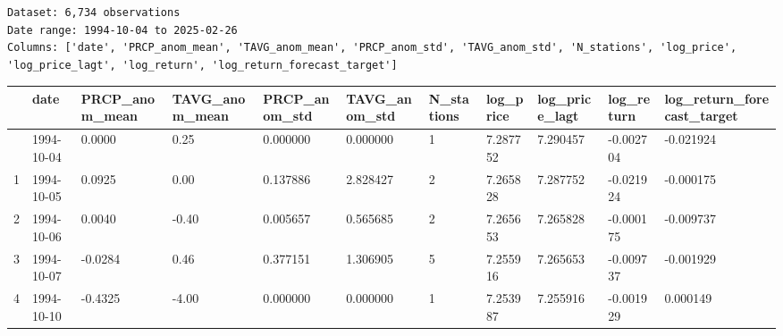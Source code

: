 \documentclass[
  letterpaper,
  DIV=11,
  numbers=noendperiod]{scrartcl}
\begin{document}
\begin{verbatim}
Dataset: 6,734 observations
Date range: 1994-10-04 to 2025-02-26
Columns: ['date', 'PRCP_anom_mean', 'TAVG_anom_mean', 'PRCP_anom_std', 'TAVG_anom_std', 'N_stations', 'log_price', 'log_price_lagt', 'log_return', 'log_return_forecast_target']
\end{verbatim}

\begin{longtable}[]{@{}lllllllllll@{}}
\toprule\noalign{}
& date & PRCP\_anom\_mean & TAVG\_anom\_mean & PRCP\_anom\_std &
TAVG\_anom\_std & N\_stations & log\_price & log\_price\_lagt &
log\_return & log\_return\_forecast\_target \\
\midrule\noalign{}
\endhead
\bottomrule\noalign{}
\endlastfoot
0 & 1994-10-04 & 0.0000 & 0.25 & 0.000000 & 0.000000 & 1 & 7.287752 &
7.290457 & -0.002704 & -0.021924 \\
1 & 1994-10-05 & 0.0925 & 0.00 & 0.137886 & 2.828427 & 2 & 7.265828 &
7.287752 & -0.021924 & -0.000175 \\
2 & 1994-10-06 & 0.0040 & -0.40 & 0.005657 & 0.565685 & 2 & 7.265653 &
7.265828 & -0.000175 & -0.009737 \\
3 & 1994-10-07 & -0.0284 & 0.46 & 0.377151 & 1.306905 & 5 & 7.255916 &
7.265653 & -0.009737 & -0.001929 \\
4 & 1994-10-10 & -0.4325 & -4.00 & 0.000000 & 0.000000 & 1 & 7.253987 &
7.255916 & -0.001929 & 0.000149 \\
\end{longtable}
\end{document}
